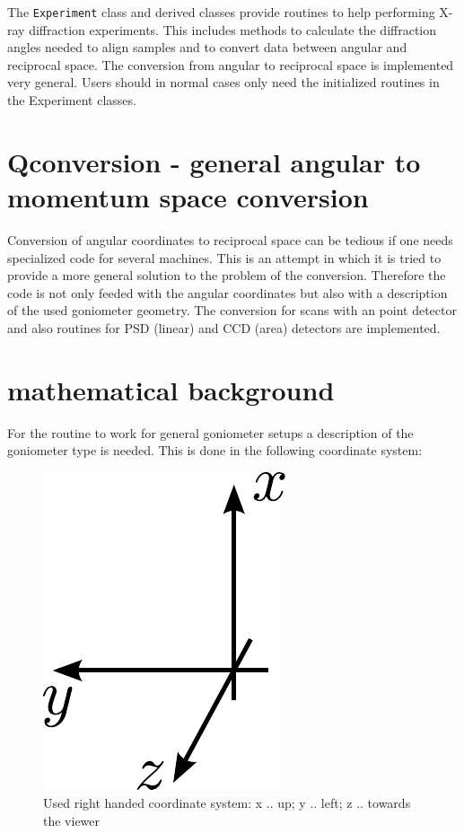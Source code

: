 %
%
%
%


The {\tt Experiment} class and derived classes provide routines to help performing X-ray diffraction experiments. This includes methods to calculate the diffraction angles needed to align samples and to convert data between angular and reciprocal space. The conversion from angular to reciprocal space is implemented very general. Users should in normal cases only need the initialized routines in the Experiment classes.

\section{Qconversion - general angular to momentum space conversion}

Conversion of angular coordinates to reciprocal space can be tedious if one needs specialized code for several machines. This is an attempt in which it is tried to provide a more general solution to the problem of the conversion. Therefore the code is not only feeded with the angular coordinates but also with a description of the used goniometer geometry. The conversion for scans with an point detector and also routines for PSD (linear) and CCD (area) detectors are implemented.

\section{mathematical background}

 For the routine to work for general goniometer setups a description of the goniometer type is needed. This is done in the following coordinate system:

\begin{figure}[H]
 \centering
 \includegraphics[width=0.13\linewidth]{pics/coordinate_system}
 \caption{Used right handed coordinate system: x .. up; y .. left; z .. towards the viewer}
 \label{fig:def_coordinate_system}
\end{figure}

